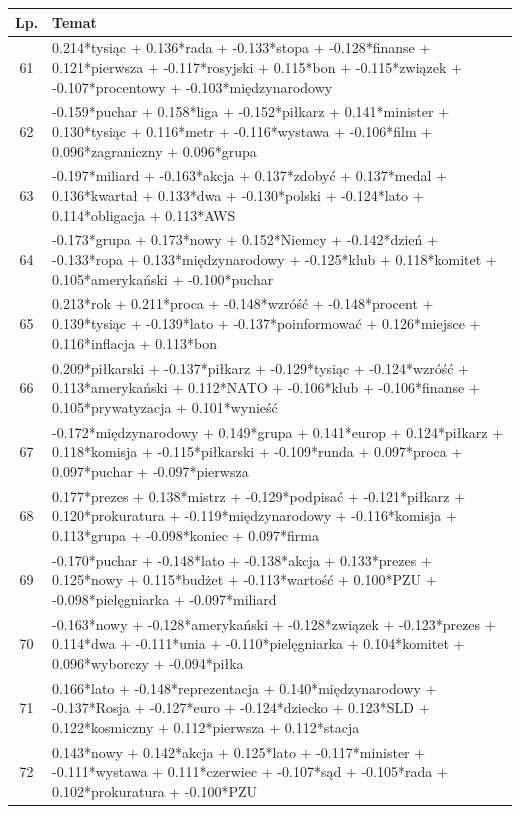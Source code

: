 \documentclass[11pt,a4paper]{article}
\begin{document}
\begin{table}[h]
\begin{tabular}{|c|>{\footnotesize}p{\linewidth}|}
\hline
Lp. & Temat \\\hline

61 & 0.214*tysiąc + 0.136*rada + -0.133*stopa + -0.128*finanse + 0.121*pierwsza + -0.117*rosyjski + 0.115*bon + -0.115*związek + -0.107*procentowy + -0.103*międzynarodowy\\\hline
62 & -0.159*puchar + 0.158*liga + -0.152*piłkarz + 0.141*minister + 0.130*tysiąc + 0.116*metr + -0.116*wystawa + -0.106*film + 0.096*zagraniczny + 0.096*grupa\\\hline
63 & -0.197*miliard + -0.163*akcja + 0.137*zdobyć + 0.137*medal + 0.136*kwartał + 0.133*dwa + -0.130*polski + -0.124*lato + 0.114*obligacja + 0.113*AWS\\\hline
64 & -0.173*grupa + 0.173*nowy + 0.152*Niemcy + -0.142*dzień + -0.133*ropa + 0.133*międzynarodowy + -0.125*klub + 0.118*komitet + 0.105*amerykański + -0.100*puchar\\\hline
65 & 0.213*rok + 0.211*proca + -0.148*wzróść + -0.148*procent + 0.139*tysiąc + -0.139*lato + -0.137*poinformować + 0.126*miejsce + 0.116*inflacja + 0.113*bon\\\hline
66 & 0.209*piłkarski + -0.137*piłkarz + -0.129*tysiąc + -0.124*wzróść + 0.113*amerykański + 0.112*NATO + -0.106*klub + -0.106*finanse + 0.105*prywatyzacja + 0.101*wynieść\\\hline
67 & -0.172*międzynarodowy + 0.149*grupa + 0.141*europ + 0.124*piłkarz + 0.118*komisja + -0.115*piłkarski + -0.109*runda + 0.097*proca + 0.097*puchar + -0.097*pierwsza\\\hline
68 & 0.177*prezes + 0.138*mistrz + -0.129*podpisać + -0.121*piłkarz + 0.120*prokuratura + -0.119*międzynarodowy + -0.116*komisja + 0.113*grupa + -0.098*koniec + 0.097*firma\\\hline
69 & -0.170*puchar + -0.148*lato + -0.138*akcja + 0.133*prezes + 0.125*nowy + 0.115*budżet + -0.113*wartość + 0.100*PZU + -0.098*pielęgniarka + -0.097*miliard\\\hline
70 & -0.163*nowy + -0.128*amerykański + -0.128*związek + -0.123*prezes + 0.114*dwa + -0.111*unia + -0.110*pielęgniarka + 0.104*komitet + 0.096*wyborczy + -0.094*piłka\\\hline
71 & 0.166*lato + -0.148*reprezentacja + 0.140*międzynarodowy + -0.137*Rosja + -0.127*euro + -0.124*dziecko + 0.123*SLD + 0.122*kosmiczny + 0.112*pierwsza + 0.112*stacja\\\hline
72 & 0.143*nowy + 0.142*akcja + 0.125*lato + -0.117*minister + -0.111*wystawa + 0.111*czerwiec + -0.107*sąd + -0.105*rada + 0.102*prokuratura + -0.100*PZU\\\hline

\end{tabular}
\end{table}
\end{document}
